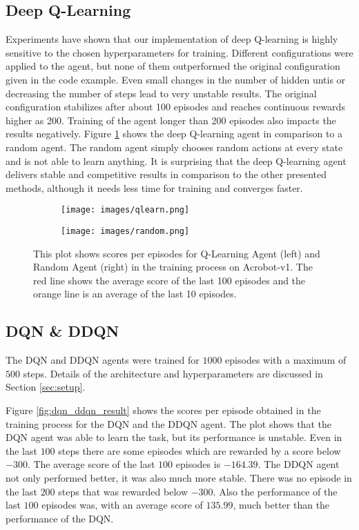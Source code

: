 \documentclass[11pt,a4paper]{article}
\begin{document}
\subsection{Deep Q-Learning}
Experiments have shown that our implementation of deep Q-learning is highly sensitive to the chosen hyperparameters for training. Different configurations were applied to the agent, but none of them outperformed the original configuration given in the code example. Even small changes in the number of hidden untis or decreasing the number of steps lead to very unstable results. The original configuration stabilizes after about 100 episodes and reaches continuous rewards higher as 200. Training of the agent longer than 200 episodes also impacts the results negatively. Figure \ref{fig:qlearn_random_result} shows the deep Q-learning agent in comparison to a random agent. The random agent simply chooses random actions at every state and is not able to learn anything. It is surprising that the deep Q-learning agent delivers stable and competitive results in comparison to the other presented methods, although it needs less time for training and converges faster.

\begin{figure}[h]
\centering
\begin{subfigure}
    \centering
    \texttt{[image: images/qlearn.png]}
\end{subfigure}%
\begin{subfigure}
    \centering
    \texttt{[image: images/random.png]}
\end{subfigure}
\caption{This plot shows scores per episodes for Q-Learning Agent (left) and Random Agent (right) in the training process on Acrobot-v1. The red line shows the average score of the last 100 episodes and the orange line is an average of the last 10 episodes.}
\label{fig:qlearn_random_result}
\end{figure}

\subsection{DQN \& DDQN}

The DQN and DDQN agents were trained for $1000$ episodes with a maximum of $500$ steps. Details of the architecture and hyperparameters are discussed in Section \ref{sec:setup}.

Figure \ref{fig:dqn_ddqn_result} shows the scores per episode obtained in the training process for the DQN and the DDQN agent. The plot shows that the DQN agent was able to learn the task, but its performance is unstable. Even in the last $100$ steps there are some episodes which are rewarded by a score below $-300$. The average score of the last $100$ episodes is $-164.39$.
The DDQN agent not only performed better, it was also much more stable. There was no episode in the last $200$ steps that was rewarded below $-300$. Also the performance of the last $100$ episodes was, with an average score of $135.99$, much better than the performance of the DQN.
\end{document}
